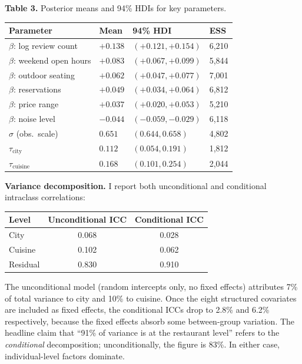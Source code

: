 \documentclass[10pt, letterpaper]{article}
\begin{document}
\begin{center}\small
\textbf{Table 3.} Posterior means and 94\% HDIs for key parameters.\\[4pt]
\renewcommand{\arraystretch}{1.2}
\begin{tabular}{@{}llll@{}}
\toprule
Parameter & Mean & 94\% HDI & ESS \\
\midrule
$\beta$: log review count   & $+0.138$ & $(+0.121, +0.154)$ & 6,210 \\
$\beta$: weekend open hours  & $+0.083$ & $(+0.067, +0.099)$ & 5,844 \\
$\beta$: outdoor seating     & $+0.062$ & $(+0.047, +0.077)$ & 7,001 \\
$\beta$: reservations        & $+0.049$ & $(+0.034, +0.064)$ & 6,812 \\
$\beta$: price range          & $+0.037$ & $(+0.020, +0.053)$ & 5,210 \\
$\beta$: noise level          & $-0.044$ & $(-0.059, -0.029)$ & 6,118 \\
$\sigma$ (obs.\ scale)       & $0.651$  & $(0.644, 0.658)$   & 4,802 \\
$\tau_{\text{city}}$          & $0.112$  & $(0.054, 0.191)$   & 1,812 \\
$\tau_{\text{cuisine}}$       & $0.168$  & $(0.101, 0.254)$   & 2,044 \\
\bottomrule
\end{tabular}
\end{center}

\textbf{Variance decomposition.} I report both unconditional and conditional intraclass correlations:

\begin{center}\small
\renewcommand{\arraystretch}{1.2}
\begin{tabular}{@{}lcc@{}}
\toprule
Level & Unconditional ICC & Conditional ICC \\
\midrule
City      & 0.068 & 0.028 \\
Cuisine   & 0.102 & 0.062 \\
Residual  & 0.830 & 0.910 \\
\bottomrule
\end{tabular}
\end{center}

The unconditional model (random intercepts only, no fixed effects) attributes 7\% of total variance to city and 10\% to cuisine. Once the eight structured covariates are included as fixed effects, the conditional ICCs drop to 2.8\% and 6.2\% respectively, because the fixed effects absorb some between-group variation. The headline claim that ``91\% of variance is at the restaurant level'' refers to the \emph{conditional} decomposition; unconditionally, the figure is 83\%. In either case, individual-level factors dominate.
\end{document}
